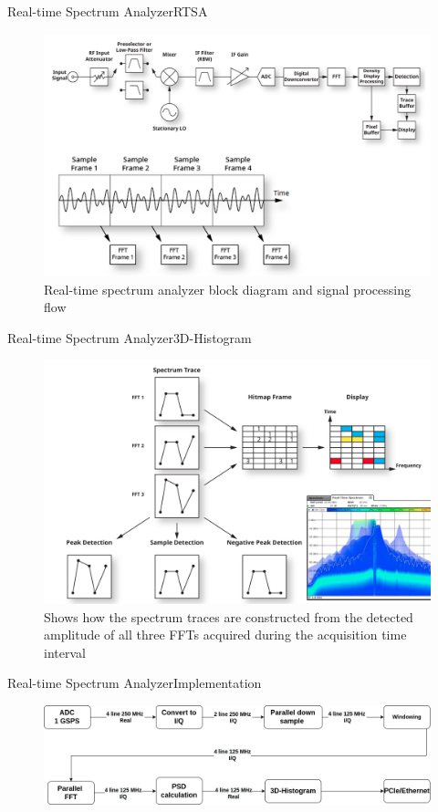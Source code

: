 \begin{frame}{Real-time Spectrum Analyzer}{RTSA}
	\begin{figure}
		\centering
		\includegraphics[scale=0.7]{graphics/rtsa_fig3.png}
		\caption{Real-time spectrum analyzer block diagram and signal processing flow}
	\end{figure}
\end{frame}
\begin{frame}{Real-time Spectrum Analyzer}{3D-Histogram}
	\begin{figure}
		\centering
		\includegraphics[scale=0.85]{graphics/rtsa_fig4.png}
		\caption{Shows how the spectrum traces are constructed from the detected
			amplitude of all three FFTs acquired during the acquisition time interval}
	\end{figure}
\end{frame}
\begin{frame}{Real-time Spectrum Analyzer}{Implementation}
	\begin{figure}
		\centering
		\includegraphics[scale=0.3]{graphics/rtsa_fig5.png}
	\end{figure}
\end{frame}
